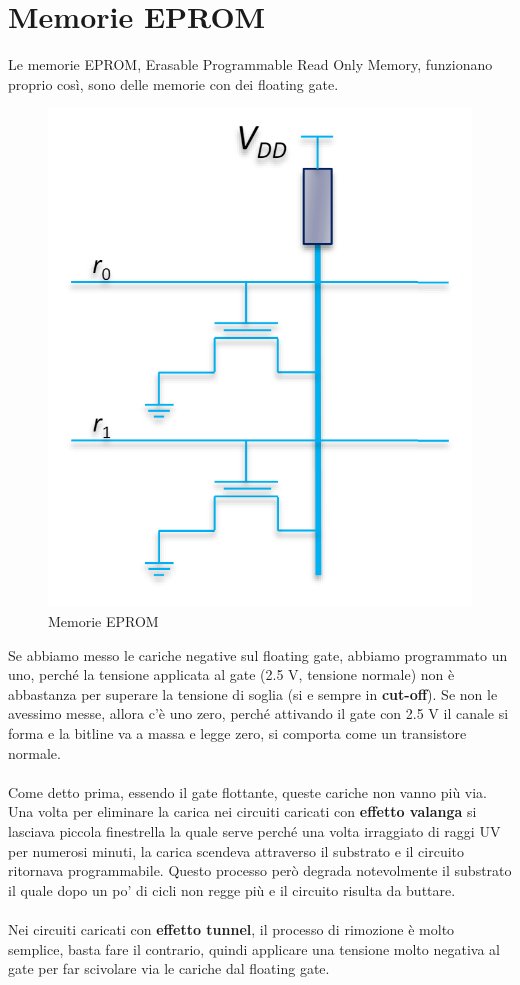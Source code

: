 \section{Memorie EPROM}
Le memorie EPROM, Erasable Programmable Read Only Memory,  funzionano proprio così, sono delle memorie con dei floating gate.


\begin{figure}[htbp]
    \centering
    \includegraphics[width=0.27\linewidth]{img/bsf.png}
    \caption{Memorie EPROM}
\end{figure}

Se abbiamo messo le cariche negative sul floating gate, abbiamo programmato un uno, perché la tensione applicata al gate (2.5 V, tensione normale) non è abbastanza per superare la tensione di soglia (si e sempre in \textbf{cut-off}). Se non le avessimo messe, allora c'è uno zero, perché attivando il gate con 2.5 V il canale si forma e la bitline va a massa e legge zero, si comporta come un transistore normale.

\paragraph{}
Come detto prima, essendo il gate flottante, queste cariche non vanno più via. Una volta per eliminare la carica nei circuiti caricati con \textbf{effetto valanga} si lasciava piccola finestrella la quale serve perché una volta irraggiato di raggi UV per numerosi minuti, la carica scendeva attraverso il substrato e il circuito ritornava programmabile. Questo processo però degrada notevolmente il substrato il quale dopo un po' di cicli non regge più e il circuito risulta da buttare.

\paragraph{}

Nei circuiti caricati con \textbf{effetto tunnel}, il processo di rimozione è molto semplice, basta fare il contrario, quindi applicare una tensione molto negativa al gate per far scivolare via le cariche dal floating gate.

